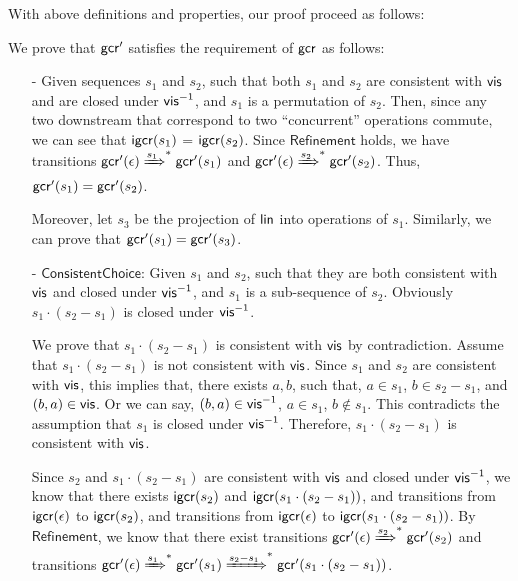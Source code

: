 {With above definitions and properties, our proof proceed as follows:

 We prove that $\mathsf{gcr}'$ satisfies the requirement of $\mathsf{gcr}$ as follows:

\begin{itemize}
\setlength{\itemsep}{0.5pt}
\item[-] Given sequences $s_1$ and $s_2$, such that both $s_1$ and $s_2$ are consistent with $\mathsf{vis}$ and are closed under $\mathsf{vis}^{-1}$, and $s_1$ is a permutation of $s_2$. Then, since any two downstream that correspond to two ``concurrent'' operations commute, we can see that $\mathsf{igcr}(s_1)$ = $\mathsf{igcr}(s_2)$. Since $\mathsf{Refinement}$ holds, we have transitions $\mathsf{gcr}'(\epsilon)\xRightarrow{s_1}^*\mathsf{gcr}'(s_1)$ and $\mathsf{gcr}'(\epsilon)\xRightarrow{s_2}^*\mathsf{gcr}'(s_2)$. Thus, $\mathsf{gcr}'(s_1) = \mathsf{gcr}'(s_2)$.

    Moreover, let $s_3$ be the projection of $\mathsf{lin}$ into operations of $s_1$. Similarly, we can prove that $\mathsf{gcr}'(s_1) = \mathsf{gcr}'(s_3)$.

\item[-] $\mathsf{ConsistentChoice}$: Given $s_1$ and $s_2$, such that they are both consistent with $\mathsf{vis}$ and closed under $\mathsf{vis}^{-1}$, and $s_1$ is a sub-sequence of $s_2$. Obviously $s_1 \cdot (s_2 - s_1)$ is closed under $\mathsf{vis}^{-1}$.

    We prove that $s_1 \cdot (s_2 - s_1)$ is consistent with $\mathsf{vis}$ by contradiction. Assume that $s_1 \cdot (s_2 - s_1)$ is not consistent with $\mathsf{vis}$. Since $s_1$ and $s_2$ are consistent with $\mathsf{vis}$, this implies that, there exists $a,b$, such that, $a \in s_1$, $b \in s_2 - s_1$, and $(b,a) \in \mathsf{vis}$. Or we can say, $(b,a) \in \mathsf{vis}^{-1}$, $a \in s_1$, $b \notin s_1$. This contradicts the assumption that $s_1$ is closed under $\mathsf{vis}^{-1}$. Therefore, $s_1 \cdot (s_2 - s_1)$ is consistent with $\mathsf{vis}$.

    Since $s_2$ and $s_1 \cdot (s_2 - s_1)$ are consistent with $\mathsf{vis}$ and closed under $\mathsf{vis}^{-1}$, we know that there exists $\mathsf{igcr}(s_2)$ and $\mathsf{igcr}(s_1 \cdot (s_2 - s_1))$, and transitions from $\mathsf{igcr}(\epsilon)$ to $\mathsf{igcr}(s_2)$, and transitions from $\mathsf{igcr}(\epsilon)$ to $\mathsf{igcr}(s_1 \cdot (s_2 - s_1))$. By $\mathsf{Refinement}$, we know that there exist transitions $\mathsf{gcr}'(\epsilon)\xRightarrow{s_2}^*\mathsf{gcr}'(s_2)$ and transitions $\mathsf{gcr}'(\epsilon)\xRightarrow{s_1}^*\mathsf{gcr}'(s_1)\xRightarrow{s_2 - s_1}^*\mathsf{gcr}'(s_1 \cdot (s_2 - s_1))$.


\end{itemize}}
